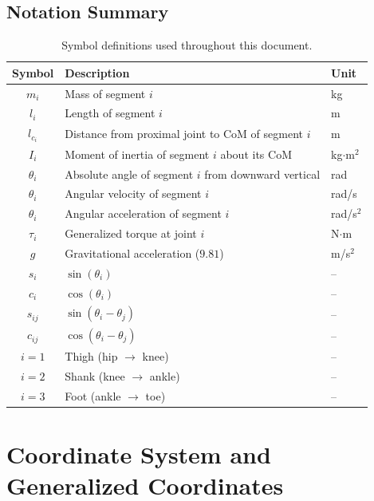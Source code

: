 \documentclass[11pt,a4paper]{article}
\newcommand{\dt}[1]{\dot{#1}}
\newcommand{\ddt}[1]{\ddot{#1}}
\def\dt#1{#1}%
\def\ddt#1{#1}%
\begin{document}
\subsection{Notation Summary}

\begin{table}[H]
\centering
\caption{Symbol definitions used throughout this document.}
\label{tab:notation}
\begin{tabular}{@{}cll@{}}
\toprule
\textbf{Symbol} & \textbf{Description} & \textbf{Unit} \\
\midrule
$m_i$ & Mass of segment $i$ & kg \\
$l_i$ & Length of segment $i$ & m \\
$l_{c_i}$ & Distance from proximal joint to CoM of segment $i$ & m \\
$I_i$ & Moment of inertia of segment $i$ about its CoM & kg$\cdot$m$^2$ \\
$\theta_i$ & Absolute angle of segment $i$ from downward vertical & rad \\
$\dt{\theta}_i$ & Angular velocity of segment $i$ & rad/s \\
$\ddt{\theta}_i$ & Angular acceleration of segment $i$ & rad/s$^2$ \\
$\tau_i$ & Generalized torque at joint $i$ & N$\cdot$m \\
$g$ & Gravitational acceleration ($9.81$) & m/s$^2$ \\
\midrule
$s_i$ & $\sin(\theta_i)$ & -- \\
$c_i$ & $\cos(\theta_i)$ & -- \\
$s_{ij}$ & $\sin(\theta_i - \theta_j)$ & -- \\
$c_{ij}$ & $\cos(\theta_i - \theta_j)$ & -- \\
\midrule
$i=1$ & Thigh (hip $\to$ knee) & -- \\
$i=2$ & Shank (knee $\to$ ankle) & -- \\
$i=3$ & Foot (ankle $\to$ toe) & -- \\
\bottomrule
\end{tabular}
\end{table}

\section{Coordinate System and Generalized Coordinates}
\end{document}
